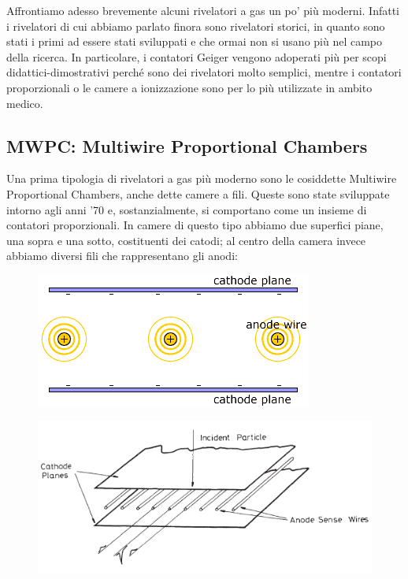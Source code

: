 Affrontiamo adesso brevemente alcuni rivelatori a gas un po' più moderni. Infatti i rivelatori di cui abbiamo parlato finora sono rivelatori storici, in quanto sono stati i primi ad essere stati sviluppati e che ormai non si usano più nel campo della ricerca. In particolare, i contatori Geiger vengono adoperati più per scopi didattici-dimostrativi perché sono dei rivelatori molto semplici, mentre i contatori proporzionali o le camere a ionizzazione sono per lo più utilizzate in ambito medico.

\subsection{MWPC: Multiwire Proportional Chambers}

Una prima tipologia di rivelatori a gas più moderno sono le cosiddette Multiwire Proportional Chambers, anche dette camere a fili. Queste sono state sviluppate intorno agli anni '70 e, sostanzialmente, si comportano come un insieme di contatori proporzionali. In camere di questo tipo abbiamo due superfici piane, una sopra e una sotto, costituenti dei catodi; al centro della camera invece abbiamo diversi fili che rappresentano gli anodi:

\begin{minipage}{0.49\textwidth}
   \begin{figure}[H]
      \centering
      \includegraphics[width=\textwidth]{immagini/MWPC_1.png}
   \end{figure}
\end{minipage}
\hfill
\begin{minipage}{0.49\textwidth}
   \begin{figure}[H]
      \centering
      \includegraphics[width=\textwidth]{immagini/MWPC_2.png}
   \end{figure}
\end{minipage}

